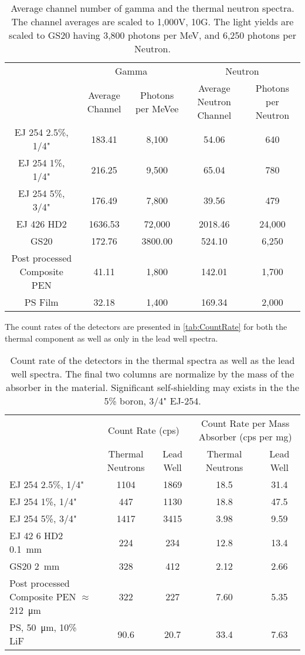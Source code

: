 \documentclass[onecolumn]{IEEEtran}
\begin{document}
\begin{table}
  \centering
  \caption[Average Channel Number of Gamma and Neutron Spectra]{Average channel number of gamma and the thermal neutron spectra.  The channel averages are scaled to 1,000V, 10G. The light yields are scaled to GS20 having 3,800 photons per MeV, and 6,250 photons per Neutron.}
  \label{tab:AvgChNG}
  \begin{tabular}{c| c c |c c}
    \toprule
        &\multicolumn{2}{|c|}{Gamma}&\multicolumn{2}{|c}{Neutron}\\
        & Average Channel& Photons per MeVee & Average Neutron Channel & Photons per Neutron\\
    \midrule
    EJ 254 2.5\%, 1/4"&	183.41	&	8,100	&	54.06	&	640	\\
    EJ 254 1\%, 1/4"&	216.25	&	9,500	&	65.04	&	780	\\
    EJ 254 5\%, 3/4"&	176.49	&	7,800	&	39.56	&	479	\\
    EJ 426 HD2&	1636.53	&	72,000	&	2018.46	& 	24,000	\\
    GS20 &	172.76	&	3800.00	&	524.10	&	6,250	\\
    Post processed Composite PEN & 41.11 & 1,800 & 142.01 & 1,700\\
    PS Film & 32.18 & 1,400 & 169.34 & 2,000 \\
    \bottomrule
  \end{tabular}
\end{table}
The count rates of the detectors are presented in \autoref{tab:CountRate} for both the thermal component as well as only in the lead well spectra.
\begin{table}
\centering
  \caption[Detector Count Rate]{Count rate of the detectors in the thermal spectra as well as the lead well spectra.  The final two columns are normalize by the mass of the absorber in the material. Significant self-shielding may exists in the the 5\% boron, 3/4" EJ-254.}
  \label{tab:CountRate}
  \begin{tabular}{p{2cm} | c c| c c}
  \toprule
    &\multicolumn{2}{|c|}{Count Rate (cps)}&\multicolumn{2}{|c}{Count Rate per Mass Absorber (cps per mg)} \\
    & Thermal Neutrons &Lead Well & Thermal Neutrons & Lead Well\\
  \midrule
  EJ 254 2.5\%, 1/4"&	1104	&	1869	&	18.5	&	31.4	\\
  EJ 254 1\%, 1/4"&	447	&	1130	&	18.8	&	47.5	\\
  EJ 254 5\%, 3/4"&	1417	&	3415	&	3.98	&	9.59	\\
  EJ 42 6 HD2 \SI{0.1}{\mm}&	224	&	234	&	12.8	&	13.4	\\
  GS20 \SI{2}{\mm}&	328	&	412	&	2.12	&	2.66	\\
  Post processed Composite PEN $\approx$ \SI{212}{\um}&	322	& 227	&	7.60	&	5.35	\\
  PS, \SI{50}{\um}, 10\% LiF & 90.6 & 20.7 & 33.4 & 7.63 \\
  \bottomrule
  \end{tabular}
\end{table}
\end{document}
